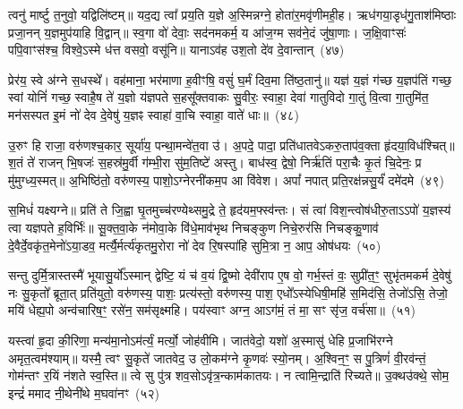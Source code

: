 त्वनु॑ मार्ष्टु त॒नुवो॒ यद्विलि॑ष्टम्॥ यद॒द्य त्वा᳚ प्रय॒ति य॒ज्ञे अ॒स्मिन्नग्ने॒ होता॑र॒मवृ॑णीमही॒ह। ऋध॑गया॒डृध॑गु॒ताश॑मिष्ठाः प्रजा॒नन् य॒ज्ञमुप॑याहि वि॒द्वान्॥ स्व॒गा वो॑ देवाः॒ सद॑नमकर्म॒ य आ॑ज॒ग्म सव॑ने॒दं जु॑षा॒णाः। ज॒क्षि॒वाꣳसः॑ पपि॒वाꣳस॑श्च॒ विश्वे॒\-ऽस्मे ध॑त्त वसवो॒ वसू॑नि॥ याना\-ऽव॑ह उश॒तो दे॑व दे॒वान्तान्~(४७)\ip

प्रेर॑य॒ स्वे अ॑ग्ने स॒धस्थे᳚। वह॑माना॒ भर॑माणा ह॒वीꣳषि॒ वसुं॑ घ॒र्मं दिव॒मा ति॑ष्ठ॒तानु॑॥ यज्ञ॑ य॒ज्ञं ग॑च्छ य॒ज्ञप॑तिं गच्छ॒ स्वां योनिं॑ गच्छ॒ स्वाहै॒ष ते॑ य॒ज्ञो य॑ज्ञपते स॒हसू᳚क्तवाकः सु॒वीरः॒ स्वाहा॒ देवा॑ गातुविदो गा॒तुं वि॒त्वा गा॒तुमि॑त॒ मन॑सस्पत इ॒मं नो॑ देव दे॒वेषु॑ य॒ज्ञꣴ स्वाहा॑ वा॒चि स्वाहा॒ वाते॑ धाः॥~(४८)\ip

{\anuvakamend[{कृ॒णो॒तु॒ तान॒ष्टाच॑त्वारिꣳशच्च}]}%

उ॒रुꣳ हि राजा॒ वरु॑णश्च॒कार॒ सूर्या॑य॒ पन्था॒मन्वे॑त॒वा उ॑। अ॒पदे॒ पादा॒ प्रति॑धातवे\-ऽकरु॒ताप॑व॒क्ता हृ॑दया॒विध॑श्चित्॥ श॒तं ते॑ राजन् भि॒षजः॑ स॒हस्र॑मु॒र्वी ग॑म्भी॒रा सु॑म॒तिष्टे॑ अस्तु। बाध॑स्व॒ द्वेषो॒ निर्\mbox{}ऋ॑तिं परा॒चैः कृ॒तं चि॒देनः॒ प्र मु॑मुग्ध्य॒स्मत्॥ अ॒भिष्ठि॑तो॒ वरु॑णस्य॒ पाशो॒\-ऽग्नेरनी॑कम॒प आ वि॑वेश। अपां᳚ नपात् प्रति॒रक्ष॑न्नसु॒र्यं॑ दमे॑दमे~(४९)\ip

स॒मिधं॑ यक्ष्यग्ने॥ प्रति॑ ते जि॒ह्वा घृ॒तमुच्च॑रण्येथ्समु॒द्रे ते॒ हृद॑यम॒फ्स्व॑न्तः। सं त्वा॑ विश॒न्त्वोष॑धीरु॒ता\-ऽऽ\-पो॑ य॒ज्ञस्य॑ त्वा यज्ञपते ह॒विर्भिः॑॥ सू॒क्त॒वा॒के न॑मोवा॒के वि॑धे॒माव॑भृथ निचङ्कुण निचे॒रुर॑सि निचङ्कु॒णाव॑ दे॒वैर्दे॒वकृ॑त॒मेनो॑\-ऽया॒डव॒ मर्त्यै॒र्मर्त्य॑कृतमु॒रोरा नो॑ देव रि॒षस्पा॑हि सुमि॒त्रा न॒ आप॒ ओष॑धयः~(५०)\ip

सन्तु दुर्मि॒त्रास्तस्मै॑ भूयासु॒र्यो᳚\-ऽस्मान् द्वेष्टि॒ यं च॑ व॒यं द्वि॒ष्मो देवी॑राप ए॒ष वो॒ गर्भ॒स्तं वः॒ सुप्री॑त॒ꣳ॒ सुभृ॑तमकर्म दे॒वेषु॑ नः सु॒कृतो᳚ ब्रूता॒त् प्रति॑युतो॒ वरु॑णस्य॒ पाशः॒ प्रत्य॑स्तो॒ वरु॑णस्य॒ पाश॒ एधो᳚\-ऽस्येधिषी॒महि॑ स॒मिद॑सि॒ तेजो॑\-ऽसि॒ तेजो॒ मयि॑ धेह्य॒पो अन्व॑चारिष॒ꣳ॒ रसे॑न॒ सम॑सृक्ष्महि। पय॑स्वाꣳ अग्न॒ आ\-ऽग॑मं॒ तं मा॒ सꣳ सृ॑ज॒ वर्च॑सा॥~(५१)\ip

{\anuvakamend[{दमे॑दम॒ ओष॑धय॒ आ षट् च॑}]}%

यस्त्वा॑ हृ॒दा की॒रिणा॒ मन्य॑मा॒नो\-ऽम॑र्त्यं॒ मर्त्यो॒ जोह॑वीमि। जात॑वेदो॒ यशो॑ अ॒स्मासु॑ धेहि प्र॒जाभि॑रग्ने अमृत॒त्वम॑श्याम्॥ यस्मै॒ त्वꣳ सु॒कृते॑ जातवेद॒ उ लो॒कम॑ग्ने कृ॒णवः॑ स्यो॒नम्। अ॒श्विन॒ꣳ॒ स पु॒त्रिणं॑ वी॒रव॑न्तं॒ गोम॑न्तꣳ र॒यिं न॑शते स्व॒स्ति॥ त्वे सु पु॑त्र शव॒सो\-ऽवृ॑त्र॒न्काम॑कातयः। न त्वामि॒न्द्राति॑ रिच्यते॥ उ॒क्थउ॑क्थे॒ सोम॒ इन्द्रं॑ ममाद नी॒थेनी॑थे म॒घवा॑नꣳ~(५२)\ip

